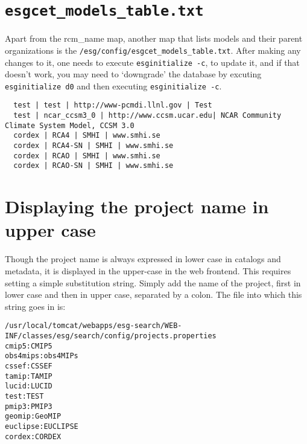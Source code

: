 \section{\texttt{esgcet\_models\_table.txt}}
Apart from the rcm\_name map, another map that lists models and their parent organizations is the \texttt{/esg/config/esgcet\_models\_table.txt}. After making any changes to it, one needs to execute \texttt{esginitialize -c}, to update it, and if that doesn't work, you may need to `downgrade' the database by excuting \texttt{esginitialize \myopt d0} and then executing \texttt{esginitialize -c}.
\begin{tiny}
\begin{verbatim}
  test | test | http://www-pcmdi.llnl.gov | Test
  test | ncar_ccsm3_0 | http://www.ccsm.ucar.edu| NCAR Community Climate System Model, CCSM 3.0
  cordex | RCA4 | SMHI | www.smhi.se
  cordex | RCA4-SN | SMHI | www.smhi.se
  cordex | RCAO | SMHI | www.smhi.se
  cordex | RCAO-SN | SMHI | www.smhi.se
\end{verbatim}
\end{tiny}

\section{Displaying the project name in upper case}
Though the project name is always expressed in lower case in catalogs and metadata, it is displayed in the upper-case in the web frontend. This requires setting a simple substitution string. Simply add the name of the project, first in lower case and then in upper case, separated by a colon. The file into which this string goes in is:
\vspace{-4mm}
\begin{small}
\begin{verbatim}
/usr/local/tomcat/webapps/esg-search/WEB-INF/classes/esg/search/config/projects.properties
cmip5:CMIP5
obs4mips:obs4MIPs
cssef:CSSEF
tamip:TAMIP
lucid:LUCID
test:TEST
pmip3:PMIP3
geomip:GeoMIP
euclipse:EUCLIPSE
cordex:CORDEX
\end{verbatim}
\end{small}

